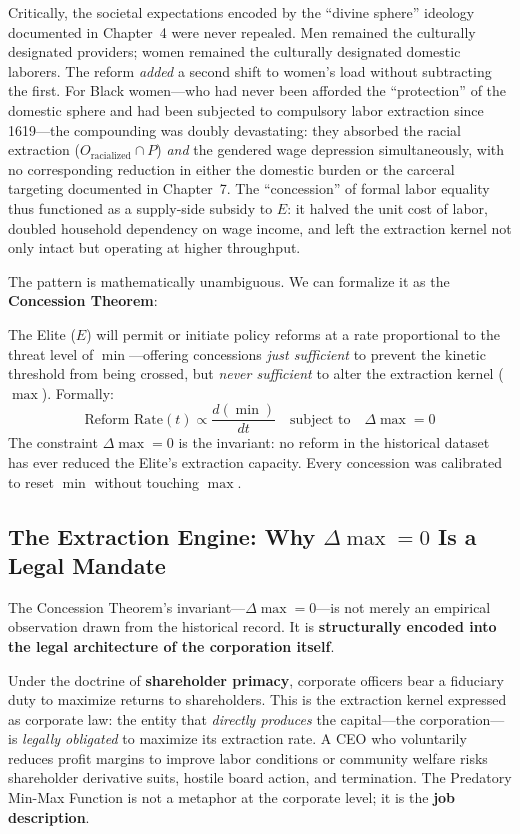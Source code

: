 \documentclass[12pt,openany]{book}
\begin{document}
\begin{enumerate}
    Critically, the societal expectations encoded by the ``divine sphere'' ideology documented in Chapter~4 were never repealed. Men remained the culturally designated providers; women remained the culturally designated domestic laborers. The reform \textit{added} a second shift to women's load without subtracting the first. For Black women---who had never been afforded the ``protection'' of the domestic sphere and had been subjected to compulsory labor extraction since 1619---the compounding was doubly devastating: they absorbed the racial extraction ($O_{\text{racialized}} \cap P$) \textit{and} the gendered wage depression simultaneously, with no corresponding reduction in either the domestic burden or the carceral targeting documented in Chapter~7. The ``concession'' of formal labor equality thus functioned as a supply-side subsidy to $E$: it halved the unit cost of labor, doubled household dependency on wage income, and left the extraction kernel not only intact but operating at higher throughput.
\end{enumerate}

The pattern is mathematically unambiguous. We can formalize it as the \textbf{Concession Theorem}:

\begin{definition}
The Elite ($E$) will permit or initiate policy reforms at a rate proportional to the threat level of $\min$---offering concessions \textit{just sufficient} to prevent the kinetic threshold from being crossed, but \textit{never sufficient} to alter the extraction kernel ($\max$). Formally:
\[
\text{Reform Rate}(t) \propto \frac{d(\min)}{dt} \quad \text{subject to} \quad \Delta\max = 0
\]
The constraint $\Delta\max = 0$ is the invariant: no reform in the historical dataset has ever reduced the Elite's extraction capacity. Every concession was calibrated to reset $\min$ without touching $\max$.
\end{definition}

\subsection{The Extraction Engine: Why \texorpdfstring{$\Delta\max = 0$}{Δmax = 0} Is a Legal Mandate}

The Concession Theorem's invariant---$\Delta\max = 0$---is not merely an empirical observation drawn from the historical record. It is \textbf{structurally encoded into the legal architecture of the corporation itself}.

Under the doctrine of \textbf{shareholder primacy}, corporate officers bear a fiduciary duty to maximize returns to shareholders. This is the extraction kernel expressed as corporate law: the entity that \textit{directly produces} the capital---the corporation---is \textit{legally obligated} to maximize its extraction rate. A CEO who voluntarily reduces profit margins to improve labor conditions or community welfare risks shareholder derivative suits, hostile board action, and termination. The Predatory Min-Max Function is not a metaphor at the corporate level; it is the \textbf{job description}.
\end{document}
